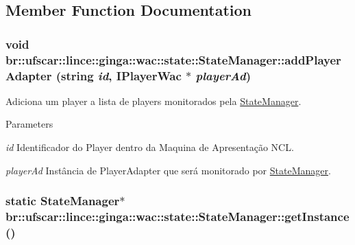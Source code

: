 \subsection{Member Function Documentation}
\hypertarget{classbr_1_1ufscar_1_1lince_1_1ginga_1_1wac_1_1state_1_1StateManager_ab0b8ca8a349b9fbda4c9960fd72345df}{
\subsubsection[{addPlayerAdapter}]{\setlength{\rightskip}{0pt plus 5cm}void br::ufscar::lince::ginga::wac::state::StateManager::addPlayerAdapter (string {\em id}, \/  {\bf IPlayerWac} $\ast$ {\em playerAd})}}
\label{classbr_1_1ufscar_1_1lince_1_1ginga_1_1wac_1_1state_1_1StateManager_ab0b8ca8a349b9fbda4c9960fd72345df}


Adiciona um player a lista de players monitorados pela \hyperlink{classbr_1_1ufscar_1_1lince_1_1ginga_1_1wac_1_1state_1_1StateManager}{StateManager}. 
\begin{DoxyParams}{Parameters}
\item[{\em id}]Identificador do Player dentro da Maquina de Apresentação NCL. \item[{\em playerAd}]Instância de PlayerAdapter que será monitorado por \hyperlink{classbr_1_1ufscar_1_1lince_1_1ginga_1_1wac_1_1state_1_1StateManager}{StateManager}. \end{DoxyParams}
\hypertarget{classbr_1_1ufscar_1_1lince_1_1ginga_1_1wac_1_1state_1_1StateManager_a7875cddb02bd5dfa72539234438b3a7e}{
\subsubsection[{getInstance}]{\setlength{\rightskip}{0pt plus 5cm}static {\bf StateManager}$\ast$ br::ufscar::lince::ginga::wac::state::StateManager::getInstance ()}}
\label{classbr_1_1ufscar_1_1lince_1_1ginga_1_1wac_1_1state_1_1StateManager_a7875cddb02bd5dfa72539234438b3a7e}


